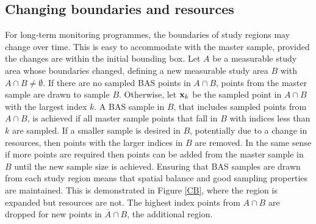 \documentclass[titlepage]{article}
\begin{document}
\subsection{Changing boundaries and resources}
For long-term monitoring programmes, the boundaries of study regions may change over time. This is easy to accommodate with the master sample, provided the changes are within the initial bounding box. Let $A$ be a measurable study area whose boundaries changed, defining a new measurable study area $B$ with $A \cap B \neq \emptyset$. If there are no sampled BAS points in $A \cap B$, points from the master sample are drawn to sample $B$. Otherwise, let ${\bf x}_k$ be the sampled point in $A \cap B$ with the largest index $k$. A BAS sample in $B$, that includes sampled points from $A \cap B$, is achieved if all master sample points that fall in $B$ with indices less than $k$ are sampled. If a smaller sample is desired in $B$, potentially due to a change in resources, then points with the larger indices in $B$ are removed. In the same sense if more points are required then points can be added from the master sample in $B$ until the new sample size is achieved. Ensuring that BAS samples are drawn from each study region means that spatial balance and good sampling properties are maintained. This is demonstrated in Figure \ref{CB}, where the region is expanded but resources are not. The highest index points from $A \cap B$ are dropped for new points in $\overline{A} \cap B$, the additional region.
\end{document}
